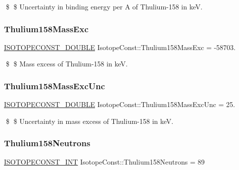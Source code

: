 \$ \$ Uncertainty in binding energy per A of Thulium-\/158 in keV. \mbox{\label{group___isotope_const-_thulium-_tm158_gaf1873f89d95fc9ddfea688217f515586}} 
\subsubsection{\texorpdfstring{Thulium158\+Mass\+Exc}{Thulium158MassExc}}
{\footnotesize\ttfamily \mbox{\hyperlink{group___isotope_const-_macros_ga8f45a7272ce02c0b4c65c44636ed719a}{I\+S\+O\+T\+O\+P\+E\+C\+O\+N\+S\+T\+\_\+\+D\+O\+U\+B\+LE}} Isotope\+Const\+::\+Thulium158\+Mass\+Exc = -\/58703.}

\$ \$ Mass excess of Thulium-\/158 in keV. \mbox{\label{group___isotope_const-_thulium-_tm158_ga22f79c6b1160a843845de5871de94bd5}} 
\subsubsection{\texorpdfstring{Thulium158\+Mass\+Exc\+Unc}{Thulium158MassExcUnc}}
{\footnotesize\ttfamily \mbox{\hyperlink{group___isotope_const-_macros_ga8f45a7272ce02c0b4c65c44636ed719a}{I\+S\+O\+T\+O\+P\+E\+C\+O\+N\+S\+T\+\_\+\+D\+O\+U\+B\+LE}} Isotope\+Const\+::\+Thulium158\+Mass\+Exc\+Unc = 25.}

\$ \$ Uncertainty in mass excess of Thulium-\/158 in keV. \mbox{\label{group___isotope_const-_thulium-_tm158_ga5138e9da3b9702f6948f476d97cc40e2}} 
\subsubsection{\texorpdfstring{Thulium158\+Neutrons}{Thulium158Neutrons}}
{\footnotesize\ttfamily \mbox{\hyperlink{group___isotope_const-_macros_ga5f18360b3e99483a35c32d789e62621c}{I\+S\+O\+T\+O\+P\+E\+C\+O\+N\+S\+T\+\_\+\+I\+NT}} Isotope\+Const\+::\+Thulium158\+Neutrons = 89}

